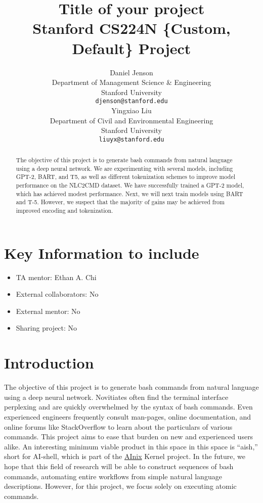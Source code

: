 \documentclass{article}
\title{
  Title of your project \\
  \vspace{1em}
  \small{\normalfont Stanford CS224N \{Custom, Default\} Project}  %
}
\author{
 Daniel Jenson \\
  Department of Management Science \& Engineering \\
  Stanford University \\
  \texttt{djenson@stanford.edu} \\
  \And
  Yingxiao Liu \\
  Department of Civil and Environmental Engineering \\
  Stanford University \\
  \texttt{liuyx@stanford.edu} \\
}
\begin{document}
\maketitle

\begin{abstract}
	The objective of this project is to generate bash commands from natural
	language using a deep neural network. We are experimenting with several models,
	including GPT-2, BART, and T5, as well as different tokenization schemes to
	improve model performance on the NLC2CMD dataset. We have successfully
	trained a GPT-2 model, which has achieved modest performance. Next, we will
	next train models using BART and T-5. However, we suspect that the majority
	of gains may be achieved from improved encoding and tokenization.
\end{abstract}


\section{Key Information to include}
\begin{itemize}
	\item TA mentor: Ethan A. Chi
	\item External collaborators: No
	\item External mentor: No
	\item Sharing project: No
\end{itemize}


\section{Introduction}
The objective of this project is to generate bash commands from natural
language using a deep neural network. Novitiates often find the terminal
interface perplexing and are quickly overwhelmed by the syntax of bash
commands. Even experienced engineers frequently consult man-pages, online
documentation, and online forums like StackOverflow to learn about the
particulars of various commands. This project aims to ease that burden on new
and experienced users alike. An interesting minimum viable product in this
space in this space is ``aish,'' short for AI-shell, which is part of the
\href{http://anix.org}{AInix} Kernel project. In the future, we hope that this
field of research will be able to construct sequences of bash commands,
automating entire workflows from simple natural language descriptions. However,
for this project, we focus solely on executing atomic commands.
\end{document}
